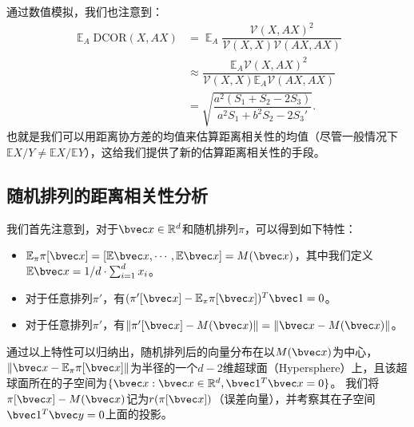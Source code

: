 通过数值模拟，我们也注意到：
\begin{equation}
\label{eq:ss-perm:linear-dcor-estimation}
\begin{split}
    \mathop{\mathbb E}_A \text{DCOR}(X, AX) & = \mathop{\mathbb E}_A \dfrac{\mathcal{V}(X, AX)^2}{\mathcal{V}(X, X)\mathcal{V}(AX, AX)}
    \\
    &\approx \dfrac{\mathbb E_A \mathcal{V}(X, AX)^2}{\mathcal{V}(X, X) \mathbb E_A \mathcal{V}(AX, AX)}
    \\
    &= \sqrt{\dfrac{a^2(S_1 + S_2 - 2S_3)}{a^2S_1 + b^2S_2 - 2S_3'}}.
\end{split}
\end{equation}
%
也就是我们可以用距离协方差的均值来估算距离相关性的均值（尽管一般情况下$\mathbb E X/Y \ne \mathbb E X/\mathbb E Y$），这给我们提供了新的估算距离相关性的手段。
%


\subsection{随机排列的距离相关性分析}
我们首先注意到，对于$\bvec x \in \mathbb R^d$和随机排列$\pi$，可以得到如下特性：
\begin{itemize}
    \item $\mathbb E_\pi \pi[\bvec x] = [\mathbb E\bvec x, \cdots, \mathbb E\bvec x] = M(\bvec x)$，其中我们定义$\mathbb E\bvec x = 1/d \cdot \sum_{i=1}^d x_i$。
    \item 对于任意排列$\pi'$，有$(\pi'[\bvec x] - \mathbb E_{\pi}\pi[\bvec x])^T \bvec 1 = 0$。
    \item 对于任意排列$\pi'$，有$\Vert \pi'[\bvec x] - M(\bvec x)\Vert = \Vert \bvec x - M(\bvec x)\Vert$。
\end{itemize}
%
通过以上特性可以归纳出，随机排列后的向量分布在以$M(\bvec x)$为中心，$\Vert \bvec x - \mathbb E_\pi \pi[\bvec x]\Vert$为半径的一个$d - 2$维超球面（Hypersphere）上，且该超球面所在的子空间为$\{\bvec x: \bvec x \in \mathbb R^d, \bvec 1^T\bvec x = 0\}$。
%
我们将$\pi[\bvec x] - M(\bvec x)$记为$r(\pi[\bvec x])$（误差向量），并考察其在子空间$\bvec 1^T \bvec y = 0$上面的投影。
%

